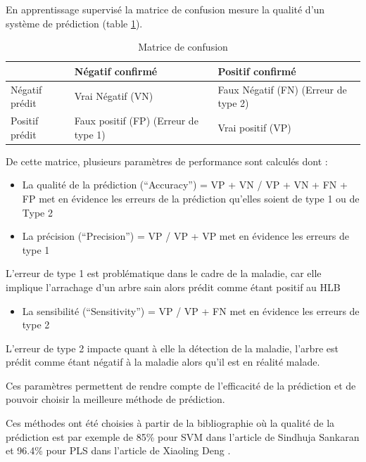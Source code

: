 \documentclass[
  11pt,
  french,
  a4paper,
  extrafontsizes,onecolumn,openright
  ]{memoir}
\providecommand{\tightlist}{%
  \setlength{\itemsep}{0pt}\setlength{\parskip}{0pt}}
\begin{document}
En apprentissage supervisé la matrice de confusion mesure la qualité d'un système de prédiction (table \ref{tab:MC}).

\scriptsize

\begin{longtable}[t]{lll}
\caption{\label{tab:MC}Matrice de confusion}\\
\toprule
  & Négatif confirmé & Positif confirmé\\
\midrule
Négatif prédit & Vrai Négatif (VN) & Faux Négatif (FN) (Erreur de type 2)\\
Positif prédit & Faux positif (FP) (Erreur de type 1) & Vrai positif (VP)\\
\bottomrule
\end{longtable}

\normalsize

De cette matrice, plusieurs paramètres de performance sont calculés dont :

\begin{itemize}
\item
  La qualité de la prédiction (``Accuracy'') = VP + VN / VP + VN + FN + FP met en évidence les erreurs de la prédiction qu'elles soient de type 1 ou de Type 2
\item
  La précision (``Precision'') = VP / VP + VP met en évidence les erreurs de type 1
\end{itemize}

L'erreur de type 1 est problématique dans le cadre de la maladie, car elle implique l'arrachage d'un arbre sain alors prédit comme étant positif au HLB

\begin{itemize}
\tightlist
\item
  La sensibilité (``Sensitivity'') = VP / VP + FN met en évidence les erreurs de type 2
\end{itemize}

L'erreur de type 2 impacte quant à elle la détection de la maladie, l'arbre est prédit comme étant négatif à la maladie alors qu'il est en réalité malade.

Ces paramètres permettent de rendre compte de l'efficacité de la prédiction et de pouvoir choisir la meilleure méthode de prédiction.

Ces méthodes ont été choisies à partir de la bibliographie où la qualité de la prédiction est par exemple de 85\% pour SVM dans l'article de Sindhuja Sankaran \autocite{sankaran_huanglongbing_2013} et 96.4\% pour PLS dans l'article de Xiaoling Deng \autocite{deng_detection_2020}.
\end{document}
